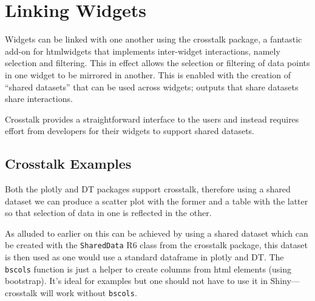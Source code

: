 \documentclass[
]{krantz}
\makeatletter
\newenvironment{Shaded}{\begin{snugshade}}{\end{snugshade}}
\newcommand{\DataTypeTok}[1]{\textcolor[rgb]{0.27,0.27,0.27}{#1}}
\newcommand{\KeywordTok}[1]{\textcolor[rgb]{0.27,0.27,0.27}{\textbf{#1}}}
\newcommand{\NormalTok}[1]{#1}
\newcommand{\OperatorTok}[1]{\textcolor[rgb]{0.43,0.43,0.43}{\textbf{#1}}}
\newcommand{\StringTok}[1]{\textcolor[rgb]{0.5,0.5,0.5}{#1}}
\newenvironment{kframe}{%
\medskip{}
\setlength{\fboxsep}{.8em}
 \def\at@end@of@kframe{}%
 \ifinner\ifhmode%
  \def\at@end@of@kframe{\end{minipage}}%
  \begin{minipage}{\columnwidth}%
 \fi\fi%
 \def\FrameCommand##1{\hskip\@totalleftmargin \hskip-\fboxsep
 \colorbox{shadecolor}{##1}\hskip-\fboxsep
     \hskip-\linewidth \hskip-\@totalleftmargin \hskip\columnwidth}%
 \MakeFramed {\advance\hsize-\width
   \@totalleftmargin\z@ \linewidth\hsize
   \@setminipage}}%
 {\par\unskip\endMakeFramed%
 \at@end@of@kframe}
\renewenvironment{Shaded}{\begin{kframe}}{\end{kframe}}
\makeatother
\begin{document}
\hypertarget{linking-widgets}{%
\chapter{Linking Widgets}\label{linking-widgets}}

Widgets can be linked with one another using the crosstalk \citep{R-crosstalk} package, a fantastic add-on for htmlwidgets that implements inter-widget interactions, namely selection and filtering. This in effect allows the selection or filtering of data points in one widget to be mirrored in another. This is enabled with the creation of ``shared datasets'' that can be used across widgets; outputs that share datasets share interactions.

Crosstalk provides a straightforward interface to the users and instead requires effort from developers for their widgets to support shared datasets.

\hypertarget{linking-widgets-examples}{%
\section{Crosstalk Examples}\label{linking-widgets-examples}}

Both the plotly and DT packages support crosstalk, therefore using a shared dataset we can produce a scatter plot with the former and a table with the latter so that selection of data in one is reflected in the other.

As alluded to earlier on this can be achieved by using a shared dataset which can be created with the \texttt{SharedData} R6 class from the crosstalk package, this dataset is then used as one would use a standard dataframe in plotly and DT. The \texttt{bscols} function is just a helper to create columns from html elements (using bootstrap). It's ideal for examples but one should not have to use it in Shiny---crosstalk will work without \texttt{bscols}.

\begin{Shaded}
\end{Shaded}
\end{document}
